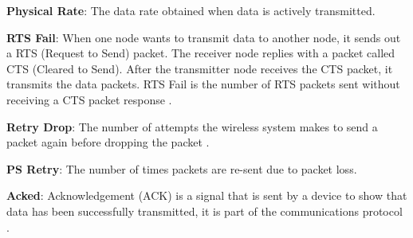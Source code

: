 \textbf{Physical Rate}: The data rate obtained when data is actively transmitted. 

\textbf{RTS Fail}: When one node wants to transmit data to another node, it sends out a RTS (Request to Send) packet. The receiver node replies with a packet called CTS (Cleared to Send). After the transmitter node receives the CTS packet, it transmits the data packets. RTS Fail is the number of RTS packets sent without receiving a CTS packet response \cite{Karn1990MACAaNC}. 

\textbf{Retry Drop}: The number of attempts the wireless system makes to send a packet again before dropping the packet \cite{RetryDrop}. 

\textbf{PS  Retry}: The number of times packets are re-sent due to packet loss.  

\textbf{Acked}: Acknowledgement (ACK) is a signal that is sent by a device to show that data has been successfully transmitted, it is part of the communications protocol \cite{ackSignal}.


